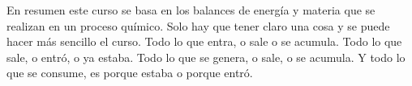 \documentclass[
	spanish, %
	letterpaper, oneside
]{article}
\begin{document}
	
\templatePortrait

\templatePagecfg

\begin{abstractd}
	En resumen este curso se basa en los balances de energía y materia que se realizan en un proceso químico.
	Solo hay que tener claro una cosa y se puede hacer más sencillo el curso. Todo lo que entra, o sale o se acumula. Todo lo que sale, o entró, o ya estaba. 
	Todo lo que se genera, o sale, o se acumula. Y todo lo que se consume, es porque estaba o porque entró.
\end{abstractd}

\templateIndex

\templateFinalcfg



\end{document}
